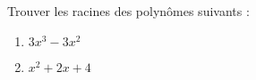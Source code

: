\bexo

Trouver les racines des polynômes suivants :

\begin{enumerate}
	\item $3x^3 - 3x^2$
	\item $x^2 + 2x + 4$
\end{enumerate}


\bigskip


\eexo
